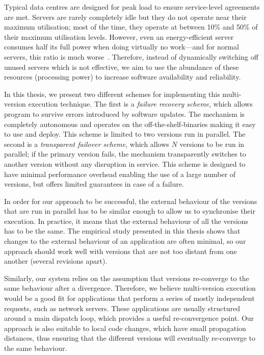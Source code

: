 Typical data centres are designed for peak load to ensure service-level
agreements are met. Servers are rarely completely idle but they do not operate
near their maximum utilisation; most of the time, they operate at between 10\%
and 50\% of their maximum utilisation levels. However, even an energy-efficient
server consumes half its full power when doing virtually no work---and for
normal servers, this ratio is much worse~\cite{barroso2007}.  Therefore,
instead of dynamically switching off unused servers which is not effective, we
aim to use the abundance of these resources (\ie processing power) to increase
software availability and reliability.

In this thesis, we present two different schemes for implementing this
multi-version execution technique. The first is a \emph{failure recovery scheme},
which allows program to survive errors introduced by software updates. The
mechanism is completely autonomous and operates on the off-the-shelf-binaries
making it easy to use and deploy. This scheme is limited to two versions run in
parallel. The second is a \emph{transparent failover scheme}, which allows $N$
versions to be run in parallel; if the primary version fails, the mechanism
transparently switches to another version without any disruption in service.
This scheme is designed to have minimal performance overhead enabling the use
of a large number of versions, but offers limited guarantees in case of a
failure.

In order for our approach to be successful, the external behaviour of the
versions that are run in parallel has to be similar enough to allow us to
synchronise their execution. In practice, it means that the external behaviour
of all the versions has to be the same. The empirical study presented in this
thesis shows that changes to the external behaviour of an application are often
minimal, so our approach should work well with versions that are not too
distant from one another (\ie several revisions apart).

Similarly, our system relies on the assumption that versions re-converge to the
same behaviour after a divergence.  Therefore, we believe multi-version
execution would be a good fit for applications that perform a series of mostly
independent requests, such as network servers. These applications are usually
structured around a main dispatch loop, which provides a useful re-convergence
point. Our approach is also suitable to local code changes, which have small
propagation distances, thus ensuring that the different versions will
eventually re-converge to the same behaviour.

